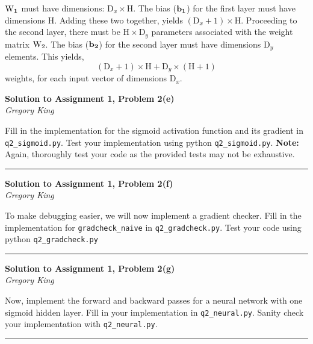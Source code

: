\documentclass[letter,12pt]{article}
\newcommand{\myhwtitle}[3]
{\begin{center}
{\large {\bf Solution to Assignment {#1}, Problem {#2}}}\\
\medskip 
{\it {#3}} %
\end{center}}
\begin{document}
\noindent $\bf{\textrm{W}}_{1}$ must have dimensions:  $\textrm{D}_{x}\times\textrm{H}$. The bias ($\bf{b}_{1}$) for the first layer must have
dimensions $\textrm{H}$. Adding these two together, yields $(\textrm{D}_{x} + 1)\times\textrm{H}$. Proceeding to the second layer,
there must be $\textrm{H}\times\textrm{D}_{y}$ parameters associated with the weight matrix ${\bf\textrm{W}}_{2}$. The bias ($\bf{b}_{2}$)
for the second layer must have dimensions $\textrm{D}_{y}$ elements. This yields, 
\begin{equation}
(\textrm{D}_{x} + 1)\times\textrm{H} + \textrm{D}_{y}\times(\textrm{H}+1)
\end{equation}
weights, for each input vector of dimensions $\textrm{D}_{x}$.
\clearpage
\myhwtitle{1}{2(e)}{Gregory King}
\bigskip
\noindent Fill in the implementation for the sigmoid activation function and its gradient in  \texttt{q2\_sigmoid.py}.
Test your implementation using python \texttt{q2\_sigmoid.py}. \textbf{Note:} Again, thoroughly test your code as the provided
tests may not be exhaustive.\vspace{5mm}

\noindent\rule{\textwidth}{0.4pt}\vspace{5mm}

\clearpage
\myhwtitle{1}{2(f)}{Gregory King}
\bigskip
\noindent To make debugging easier, we will now implement a gradient checker. Fill in the implementation
for \texttt{gradcheck\_naive} in \texttt{q2\_gradcheck.py}. Test your code using python \texttt{q2\_gradcheck.py}\vspace{5mm}

\noindent\rule{\textwidth}{0.4pt}\vspace{5mm}

\clearpage
\myhwtitle{1}{2(g)}{Gregory King}
\bigskip
\noindent  Now, implement the forward and backward passes for a neural network with one sigmoid
hidden layer. Fill in your implementation in \texttt{q2\_neural.py}. Sanity check your implementation with
\texttt{q2\_neural.py}. \\
\noindent\rule{\textwidth}{0.4pt}\vspace{5mm}
\end{document}
